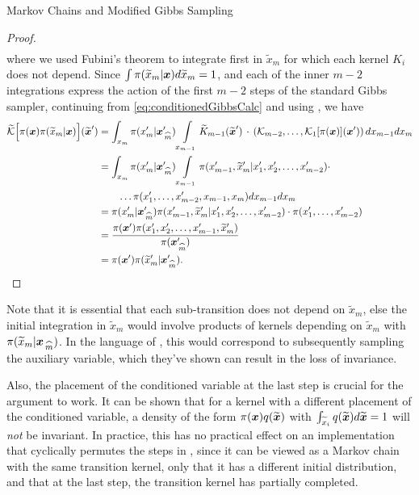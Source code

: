 \begin{chapter}{Markov Chains and Modified Gibbs Sampling}
\begin{proof}
\begin{align}
  \end{align}
  where we used Fubini's theorem to integrate first in $\tilde x_m$ for which each kernel $K_i$ does not depend. 
  Since  $\int\pi(\widetilde x_m|\mbox{\boldmath$x$})d\widetilde x_m = 1$, and each of the inner $m-2$ integrations express the action of the first $m-2$ steps of the standard Gibbs sampler, continuing from \eqref{eq:conditionedGibbsCalc} and using , we have
  \begin{align}
    \widetilde{\mathcal K}\Big[ \pi(\mbox{\boldmath$x$})\pi(\widetilde x_m|\mbox{\boldmath$x$})\Big](\widetilde{\mbox{\boldmath$x$}}')
      &= \int_{x_m}\pi(x_m'|\mbox{\boldmath$x$}_{\,\widehat{m}}') \int\limits_{x_{m-1}}\widetilde K_{m-1}(\widetilde{\mbox{\boldmath$x$}}')\,\cdot\,\left(\mathcal K_{m-2},\dots,\mathcal K_{1}[\pi(\mbox{\boldmath$x$})](\mbox{\boldmath$x$}')\right)dx_{m-1}dx_m\nonumber \\ 
      &= \int_{x_m}\pi(x_m'|\mbox{\boldmath$x$}_{\,\widehat{m}}') \int\limits_{x_{m-1}}\pi(x_{m-1}',\widetilde x_m'|x_1',x_2',\dots, x_{m-2}')\cdot\nonumber\\
        &\quad\quad\dots\pi(x_1',\dots, x_{m-2}', x_{m-1},x_m)dx_{m-1}dx_m \label{eq:dummyIntegrated}\\ 
      &= \pi(x_m'|\mbox{\boldmath$x$}_{\,\widehat{m}}') \pi(x_{m-1}',\widetilde x_m'|x_1',x_2',\dots, x_{m-2}')\cdot\pi(x_1',\dots, x_{m-2}')\nonumber \\ 
      &= \frac{\pi(\mbox{\boldmath$x$}')\pi(x_1',x_2',\dots, x_{m-1}', \widetilde x_m')}{\pi(\mbox{\boldmath$x$}_{\,\widehat{m}}')}\nonumber \\ 
      &= \pi(\mbox{\boldmath$x$}')\pi(\widetilde x_m'|\mbox{\boldmath$x$}_{\,\widehat{m}}').
  \end{align}
\end{proof}

Note that it is essential that each sub-transition does not depend on $\tilde x_m$,  else the initial integration in $\tilde x_m$ would involve products of kernels depending on $\tilde x_m$ with $\pi(\widetilde x_m|\mbox{\boldmath$x$}_{\,\widehat{m}})$. %
In the language of \citep{van2008partially}, this would correspond to subsequently sampling the auxiliary variable, which they've shown can result in the loss of invariance.

Also, the placement of the conditioned variable at the last step is crucial for the argument to work.  
It can be shown that for a kernel with a different placement of the conditioned variable, a density of the form $\pi(\mbox{\boldmath$x$})q(\widetilde{\mbox{\boldmath$x$}})$ with $\int_{\widetilde x_i} q(\widetilde{\mbox{\boldmath$x$}})d\widetilde{\mbox{\boldmath$x$}} = 1$ will \emph{not} be invariant.
In practice, this has no practical effect on an implementation that cyclically permutes the steps in , since it can be viewed as a Markov chain with the same transition kernel, only that it has a different initial distribution, and that at the last step, the transition kernel has partially completed.


\end{chapter}
